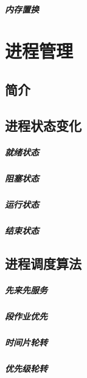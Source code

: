\documentclass[UTF8,a4paper,12pt]{ctexbook}
\begin{document}
		\paragraph{内存置换}
		
		
\chapter{进程管理}
	\section{简介}

	\section{进程状态变化}
		\paragraph{就绪状态}
				
		\paragraph{阻塞状态}
		
		\paragraph{运行状态}
		
		\paragraph{结束状态}
		
	\section{进程调度算法}
		\paragraph{先来先服务}
		
		\paragraph{段作业优先}
		
		\paragraph{时间片轮转}
		
		\paragraph{优先级轮转}
		
\end{document}
